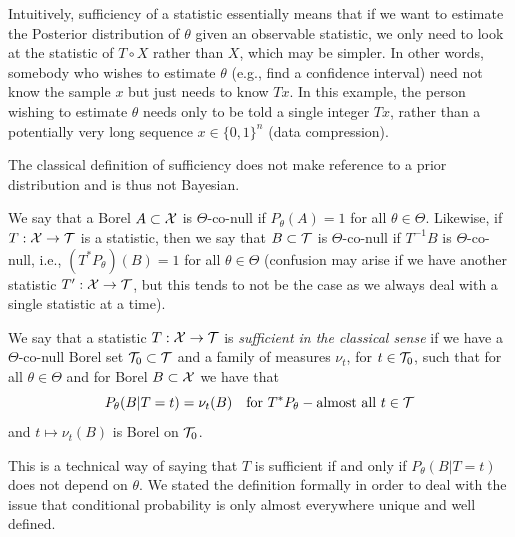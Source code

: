 \documentclass[twoside, a4paper, 10pt]{amsart}
\begin{document}
\begin{remark} Intuitively, sufficiency of a statistic essentially means that if we want to estimate the Posterior distribution of $\theta$ given an observable statistic, we only need to look at the statistic of $T \circ X$ rather than $X$, which may be simpler. In other words, somebody who wishes to estimate $\theta$ (e.g., find a confidence interval) need not know the sample $x$ but just needs to know $Tx$. In this example, the person wishing to estimate $\theta$ needs only to be told a single integer $Tx$, rather than a potentially very long sequence $x \in \{0,1\}^n$ (data compression). 
\end{remark}

The classical definition of sufficiency does not make reference to a prior distribution and is thus not Bayesian.

\begin{mydef} We say that a Borel $A \subset \mathcal{X}$ is $\Theta$-co-null if $P_{\theta}(A)=1$ for all $\theta \in \Theta$. Likewise, if $T:\mathcal{X} \to \mathcal{T}$ is a statistic, then we say that $B \subset \mathcal{T}$ is $\Theta$-co-null if $T^{-1}B$ is $\Theta$-co-null, i.e., $(T^*P_{\theta})(B) = 1$ for all $\theta \in \Theta$ (confusion may arise if we have another statistic $T':\mathcal{X} \to \mathcal{T}$, but this tends to not be the case as we always deal with a single statistic at a time). 

\end{mydef}

\begin{mydef} We say that a statistic $T:\mathcal{X} \to \mathcal{T}$ is \textit{sufficient in the classical sense} if we have a $\Theta$-co-null Borel set $\mathcal{T}_0 \subset \mathcal{T}$ and a family of measures $\nu_t$, for $t \in \mathcal{T}_0$, such that for all $\theta \in \Theta$ and for Borel $B \subset \mathcal{X}$ we have that $$P_{\theta}(B | T=t) = \nu_t(B) \quad \text{for } T^*P_{\theta}-\text{almost all } t \in \mathcal{T}$$
and $t \mapsto \nu_t(B)$ is Borel on $\mathcal{T}_0$.

\end{mydef}

This is a technical way of saying that $T$ is sufficient if and only if $P_{\theta}(B|T=t)$ does not depend on $\theta$. We stated the definition formally in order to deal with the issue that conditional probability is only almost everywhere unique and well defined.
\end{document}
